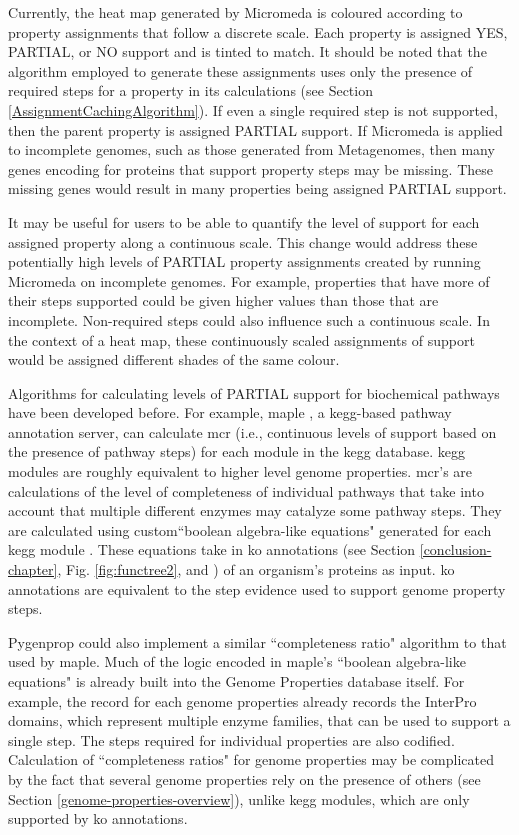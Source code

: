 Currently, the heat map generated by Micromeda is coloured according to property assignments that follow a discrete scale. Each property is assigned YES, PARTIAL, or NO support and is tinted to match. It should be noted that the algorithm employed to generate these assignments uses only the presence of required steps for a property in its calculations (see Section \ref{AssignmentCachingAlgorithm}). If even a single required step is not supported, then the parent property is assigned PARTIAL support. If Micromeda is applied to incomplete genomes, such as those generated from Metagenomes, then many genes encoding for proteins that support property steps may be missing. These missing genes would result in many properties being assigned PARTIAL support. 

It may be useful for users to be able to quantify the level of support for each assigned property along a continuous scale. This change would address these potentially high levels of PARTIAL property assignments created by running Micromeda on incomplete genomes. For example, properties that have more of their steps supported could be given higher values than those that are incomplete. Non-required steps could also influence such a continuous scale. In the context of a heat map, these continuously scaled assignments of support would be assigned different shades of the same colour.

Algorithms for calculating levels of PARTIAL support for biochemical pathways have been developed before. For example, \gls{maple} \cite{takami2016automated}, a \gls{kegg}-based pathway annotation server, can calculate \gls{mcr} (i.e., continuous levels of support based on the presence of pathway steps) for each module in the \gls{kegg}  database. \gls{kegg} modules are roughly equivalent to higher level genome properties. \gls{mcr}'s are calculations of the level of completeness of individual pathways that take into account that multiple different enzymes may catalyze some pathway steps. They are calculated using custom``boolean algebra-like equations" generated for each \gls{kegg} module \cite{takami2012evaluation}. These equations take in \gls{ko} annotations (see Section \ref{conclusion-chapter}, Fig. \ref{fig:functree2}, and \cite{mao2005automated}) of an organism's proteins as input. \gls{ko} annotations are equivalent to the step evidence used to support genome property steps. 

Pygenprop could also implement a similar ``completeness ratio" algorithm to that used by \gls{maple}. Much of the logic encoded in \gls{maple}'s ``boolean algebra-like equations" is already built into the Genome Properties database itself. For example, the record for each genome properties already records the InterPro domains, which represent multiple enzyme families, that can be used to support a single step. The steps required for individual properties are also codified. Calculation of ``completeness ratios" for genome properties may be complicated by the fact that several genome properties rely on the presence of others (see Section \ref{genome-properties-overview}), unlike \gls{kegg} modules, which are only supported by \gls{ko} annotations.

